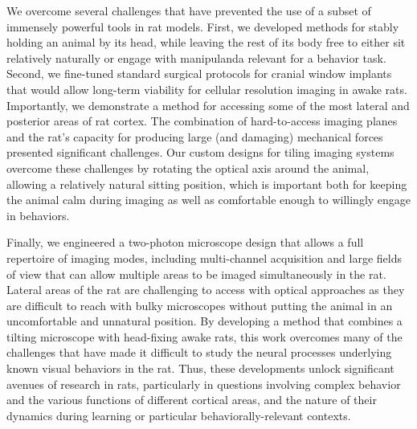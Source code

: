 We overcome several challenges that have prevented the use of a subset of immensely powerful tools in rat models. First, we developed methods for stably holding an animal by its head, while leaving the rest of its body free to either sit relatively naturally or engage with manipulanda relevant for a behavior task. Second, we fine-tuned standard surgical protocols for cranial window implants that would allow long-term viability for cellular resolution imaging in awake rats. Importantly, we demonstrate a method for accessing some of the most lateral and posterior areas of rat cortex. The combination of hard-to-access imaging planes and the rat's capacity for producing large (and damaging) mechanical forces presented significant challenges. Our custom designs for tiling imaging systems overcome these challenges by rotating the optical axis around the animal, allowing a relatively natural sitting position, which is important both for keeping the animal calm during imaging as well as comfortable enough to willingly engage in behaviors. 

Finally, we engineered a two-photon microscope design that allows a full repertoire of imaging modes, including multi-channel acquisition and large fields of view that can allow multiple areas to be imaged simultaneously in the rat. Lateral areas of the rat are challenging to access with optical approaches as they are difficult to reach with bulky microscopes without putting the animal in an uncomfortable and unnatural position. By developing a method that combines a tilting microscope with head-fixing awake rats, this work overcomes many of the challenges that have made it difficult to study the neural processes underlying known visual behaviors in the rat. Thus, these developments unlock significant avenues of research in rats, particularly in questions involving complex behavior and the various functions of different cortical areas, and the nature of their dynamics during learning or particular behaviorally-relevant contexts. 






